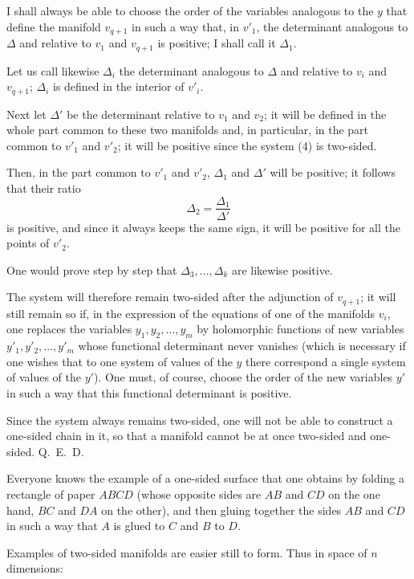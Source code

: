 \documentclass{article}
\begin{document}
I shall always be able to choose the order of the variables analogous to the $y$ that define the manifold $v_{q+1}$ in such a way that, in $v'_{1}$, the determinant analogous to $\Delta$ and relative to $v_{1}$ and $v_{q+1}$ is positive; I shall call it $\Delta_{1}$.

Let us call likewise $\Delta_{i}$ the determinant analogous to $\Delta$ and relative to $v_{i}$ and $v_{q+1}$; $\Delta_{i}$ is defined in the interior of $v'_{i}$.

Next let $\Delta'$ be the determinant relative to $v_{1}$ and $v_{2}$; it will be defined in the whole part common to these two manifolds and, in particular, in the part common to $v'_{1}$ and $v'_{2}$; it will be positive since the system (4) is two-sided.

Then, in the part common to $v'_{1}$ and $v'_{2}$, $\Delta_{1}$ and $\Delta'$ will be positive; it follows that their ratio
\[
\Delta_{2} = \frac{\Delta_{1}}{\Delta'}
\]
is positive, and since it always keeps the same sign, it will be positive for all the points of $v'_{2}$.

One would prove step by step that $\Delta_{3}, \ldots, \Delta_{k}$ are likewise positive.

The system will therefore remain two-sided after the adjunction of $v_{q+1}$; it will still remain so if, in the expression of the equations of one of the manifolds $v_{i}$, one replaces the variables $y_{1}, y_{2}, \ldots, y_{m}$ by holomorphic functions of new variables $y'_{1}, y'_{2}, \ldots, y'_{m}$ whose functional determinant never vanishes (which is necessary if one wishes that to one system of values of the $y$ there correspond a single system of values of the $y'$). One must, of course, choose the order of the new variables $y'$ in such a way that this functional determinant is positive.

Since the system always remains two-sided, one will not be able to construct a one-sided chain in it, so that a manifold cannot be at once two-sided and one-sided. Q.~E.~D.

Everyone knows the example of a one-sided surface that one obtains by folding a rectangle of paper $ABCD$ (whose opposite sides are $AB$ and $CD$ on the one hand, $BC$ and $DA$ on the other), and then gluing together the sides $AB$ and $CD$ in such a way that $A$ is glued to $C$ and $B$ to $D$.

Examples of two-sided manifolds are easier still to form. Thus in space of $n$ dimensions:
\end{document}
